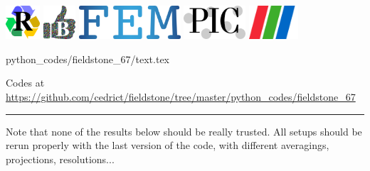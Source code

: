 \noindent
\includegraphics[height=1.25cm]{images/pictograms/replication}
\includegraphics[height=1.25cm]{images/pictograms/benchmark}
\includegraphics[height=1.25cm]{images/pictograms/FEM}
\includegraphics[height=1.25cm]{images/pictograms/pic}
\includegraphics[height=1.25cm]{images/pictograms/paraview}

\begin{flushright} {\tiny {\color{gray} python\_codes/fieldstone\_67/text.tex}} \end{flushright}

%

\begin{center}

Codes at \url{https://github.com/cedrict/fieldstone/tree/master/python_codes/fieldstone_67}
\end{center}

\par\noindent\rule{\textwidth}{0.4pt}



Note that none of the results below should be really trusted. All setups should be rerun 
properly with the last version of the code, with different averagings, projections, resolutions...

